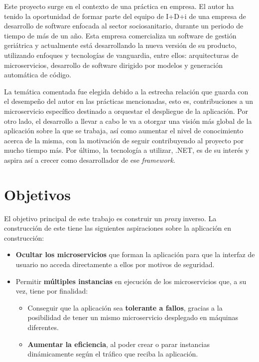 \documentclass[11pt,spanish,listoffigures]{tfgetsinf}
\begin{document}
Este proyecto surge en el contexto de una práctica en empresa. El autor ha tenido la oportunidad de formar parte del equipo de I+D+i de una empresa de desarrollo de software enfocada al sector sociosanitario, durante un periodo de tiempo de más de un año. Esta empresa comercializa un software de gestión geriátrica y actualmente está desarrollando la nueva versión de su producto, utilizando enfoques y tecnologías de vanguardia, entre ellos: arquitecturas de microservicios, desarrollo de software dirigido por modelos y generación automática de código.

La temática comentada fue elegida debido a la estrecha relación que guarda con el desempeño del autor en las prácticas mencionadas, esto es, contribuciones a un microservicio específico destinado a orquestar el despliegue de la aplicación. Por otro lado, el desarrollo a llevar a cabo le va a otorgar una visión más global de la aplicación sobre la que se trabaja, así como aumentar el nivel de conocimiento acerca de la misma, con la motivación de seguir contribuyendo al proyecto por mucho tiempo más. Por último, la tecnología a utilizar, .NET, es de su interés y aspira así a crecer como desarrollador de ese \emph{framework}.


	\section{Objetivos}

El objetivo principal de este trabajo es construir un \emph{proxy} inverso. La construcción de este tiene las siguientes aspiraciones sobre la aplicación en construcción:

\begin{itemize}

	\item \textbf{Ocultar los microservicios} que forman la aplicación para que la interfaz de usuario no acceda directamente a ellos por motivos de seguridad.

	\item Permitir \textbf{múltiples instancias} en ejecución de los microservicios que, a su vez, tiene por finalidad:

	\begin{itemize}

		\item Conseguir que la aplicación sea \textbf{tolerante a fallos}, gracias a la posibilidad de tener un mismo microservicio desplegado en máquinas diferentes.

		\item \textbf{Aumentar la eficiencia}, al poder crear o parar instancias dinámicamente según el tráfico que reciba la aplicación.

	\end{itemize}

\end{itemize}
\end{document}

